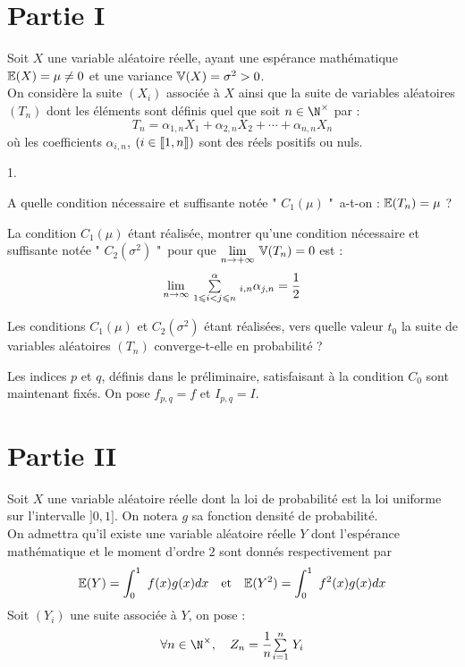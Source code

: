 \documentclass[11pt]{article}%
\begin{document}
\section*{Partie I}

Soit $X$ une variable aléatoire réelle, ayant une espérance
mathématique $\mathbb{E}(X) = \mu \not = 0$ et une variance $\mathbb{V}(X) = \sigma
^{2}>0$.\\
On considère la suite $(X_{i})$ associée à $X$ ainsi que la suite de
variables aléatoires $(T_{n})$ dont les éléments sont définis quel que
soit $n\in \N^{\times }$ par : 
\[
T_{n} = \alpha_{1,n}X_{1} + \alpha_{2,n}X_{2} + \cdots +
\alpha_{n,n}X_{n}
\]
où les coefficients $\alpha_{i,n}$, $(i\in \lbrack
\hspace{-0.15em}[1,n]\hspace{-0.13em}])$ sont des réels positifs ou
nuls.

\begin{noliste}{1.}
 \setlength{\itemsep}{4mm}
\item A quelle condition nécessaire et suffisante notée " $C_{1}(\mu )$
"\
a-t-on : $\mathbb{E}(T_{n}) = \mu $ ?

\item La condition $C_{1}(\mu )$ étant réalisée, montrer qu'une
condition nécessaire et suffisante notée " $C_{2}(\sigma ^{2})$ "\ pour
que ${\displaystyle \lim_{n\rightarrow + \infty } \ }\mathbb{V}(T_{n}) = 0$ est : 
\[
{\displaystyle \lim_{n\rightarrow \infty } \ }{\textstyle\sum\limits_{1\leqslant i<j\leqslant
n}^{\alpha}}\hspace{.1cm}_{i,n}\alpha_{j,n} = {\dfrac{1}{2}}
\]

\item Les conditions $C_{1}(\mu )$ et $C_{2}(\sigma ^{2})$ étant
réalisées,
vers quelle valeur $t_{0}$ la suite de variables aléatoires $(T_{n})$
converge-t-elle en probabilité ?
\end{noliste}

\noindent Les indices $p$ et $q$, définis dans le préliminaire,
satisfaisant 
à la condition $C_{0}$ sont maintenant fixés. On pose $f_{p,q} = f$ et
$I_{p,q} = I$.

\section*{Partie II}

Soit $X$ une variable aléatoire réelle dont la loi de probabilité est
la loi
uniforme sur l'intervalle $]0,1]$. On notera $g$ sa fonction densité de
probabilité.\\
On admettra qu'il existe une variable aléatoire réelle $Y$ dont
l'espérance
mathématique et le moment d'ordre $2$ sont donnés respectivement par 
\[
\mathbb{E}(Y) = \displaystyle \int_{0}^{1}\ f(x)g(x)dx\quad \text{et}\quad
\mathbb{E}(Y^{2}) = \displaystyle \int_{0}^{1}\ f^{2}(x)g(x)dx
\]
Soit $(Y_{i})$ une suite associée à $Y$, on pose : 
\[
\forall n\in \N^{\times },\quad Z_{n} = {\dfrac{1}{n}}\Sum{i =
1}{n}Y_{i}
\]
\end{document}
